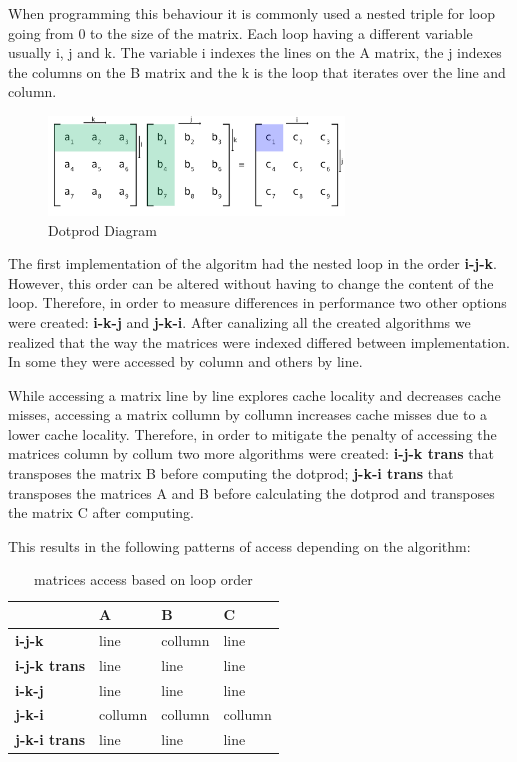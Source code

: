 \documentclass[a4paper]{report}
\begin{document}
When programming this behaviour it is commonly used a nested triple for loop
going from 0 to the size of the matrix. Each loop having a different variable
usually i, j and k. The variable i indexes the lines on the A matrix, the j
indexes the columns on the B matrix and the k is the loop that iterates over the
line and column.

\begin{figure}[H]
    \centering
        \includegraphics[width=0.7\textwidth]{images/matrix_mult.png}
        \caption{Dotprod Diagram}
\end{figure}

The first implementation of the algoritm had the nested loop in the order
\textbf{i-j-k}. However, this order can be altered without having to change the
content of the loop. Therefore, in order to measure differences in performance
two other options were created: \textbf{i-k-j} and \textbf{j-k-i}. After
canalizing all the created algorithms we realized that the way the matrices were
indexed differed between implementation. In some they were accessed by column
and others by line.

While accessing a matrix line by line explores cache locality and decreases
cache misses, accessing a matrix collumn by collumn increases cache misses due
to a lower cache locality. Therefore, in order to mitigate the penalty of
accessing the matrices column by collum two more algorithms were created:
\textbf{i-j-k trans} that transposes the matrix B before computing the
dotprod; \textbf{j-k-i trans} that transposes the matrices A and B before
calculating the dotprod and transposes the matrix C after computing.

This results in the following patterns of access depending on the algorithm:

\begin{table}[H]
\centering
\begin{tabular}{|l|l|l|l|}
\hline
                     & A       & B       & C       \\ \hline
\textbf{i-j-k}       & line    & collumn & line    \\ \hline
\textbf{i-j-k trans} & line    & line    & line    \\ \hline
\textbf{i-k-j}       & line    & line    & line    \\ \hline
\textbf{j-k-i}       & collumn & collumn & collumn \\ \hline
\textbf{j-k-i trans} & line    & line    & line    \\ \hline
\end{tabular}
\caption{matrices access based on loop order}
\end{table}
\end{document}

